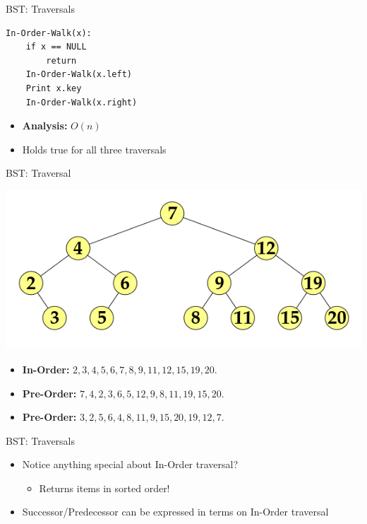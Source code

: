 \documentclass{beamer}
\begin{document}
\begin{frame}[fragile]{BST: Traversals}
\begin{verbatim}
In-Order-Walk(x):
    if x == NULL
        return
    In-Order-Walk(x.left)
    Print x.key
    In-Order-Walk(x.right)
\end{verbatim}
    \begin{itemize}
        \item {\bf Analysis:} \pause $O(n)$
        \item Holds true for all three traversals
    \end{itemize}
\end{frame}


\begin{frame}{BST: Traversal}
    \begin{center}
        \includegraphics[scale=0.4]{bstTraversalEg.png}
    \end{center}
    \begin{itemize}
        \item {\bf In-Order:} \pause $2, 3, 4, 5, 6, 7, 8 , 9, 11, 12, 15, 19, 20$.
        \item {\bf Pre-Order:} \pause $7, 4, 2, 3, 6, 5, 12, 9, 8, 11, 19, 15, 20$.
        \item {\bf Pre-Order:} \pause $3, 2, 5, 6, 4, 8, 11, 9, 15, 20, 19, 12, 7$.
    \end{itemize}
\end{frame}


\begin{frame}{BST: Traversals}
    \begin{itemize}
        \item Notice anything special about In-Order traversal? \pause
        \begin{itemize}
            \item Returns items in sorted order!
        \end{itemize}
        \item Successor/Predecessor can be expressed in terms on In-Order traversal
    \end{itemize}
\end{frame}
\end{document}
